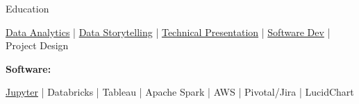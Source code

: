 \documentclass{resume/resume}
\begin{document}
\begin{rSection}{Education}
\begin{adjustwidth}{6em}{0pt}
  \href{https://github.com/UtahTriangle/Laws/blob/main/Proposals/NationalsHelp/geography_hypos.ipynb}{Data Analytics} |  %
  \href{https://spelkington.github.io/assets/utah_office_update.pdf#page=17}{Data Storytelling} |  %
  \href{https://www.youtube.com/watch?v=lMFQp3wN-cg}{Technical Presentation} |
  \href{https://github.com/spelkington}{Software Dev} |
  Project Design
  
\end{adjustwidth}


%
%
%
\vspace{-3pt}
{\bf Software:}
\vspace{-1.83em}
\begin{adjustwidth}{6em}{0pt}
  \href{https://github.com/search?q=user\%3ASpelkington+user\%3AUtahTriangle+extension\%3Aipynb&type=Code}{Jupyter} | 
  Databricks | 
  Tableau | 
  Apache Spark | 
  AWS | 
  Pivotal/Jira | 
  LucidChart


\end{adjustwidth}
\end{rSection}
\end{document}
